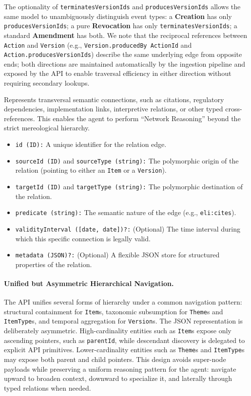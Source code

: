 \documentclass[11pt]{article}
\begin{document}
\begin{description}
    The optionality of \texttt{terminatesVersionIds} and \texttt{producesVersionIds} allows the same model to unambiguously distinguish event types: a \textbf{Creation} has only \texttt{producesVersionIds}; a pure \textbf{Revocation} has only \texttt{terminatesVersionIds}; a standard \textbf{Amendment} has both. We note that the reciprocal references between \texttt{Action} and \texttt{Version} (e.g., \texttt{Version.producedBy ActionId} and \texttt{Action.producesVersionIds}) describe the same underlying edge from opposite ends; both directions are maintained automatically by the ingestion pipeline and exposed by the API to enable traversal efficiency in either direction without requiring secondary lookups.

    \item[\texttt{Relation}:] Represents transversal semantic connections, such as citations, regulatory dependencies, implementation links, interpretive relations, or other typed cross-references. This enables the agent to perform ``Network Reasoning'' beyond the strict mereological hierarchy.
    \begin{itemize}
        \item \texttt{id (ID):} A unique identifier for the relation edge.
        \item \texttt{sourceId (ID)} and \texttt{sourceType (string):} The polymorphic origin of the relation (pointing to either an \texttt{Item} or a \texttt{Version}).
        \item \texttt{targetId (ID)} and \texttt{targetType (string):} The polymorphic destination of the relation.
        \item \texttt{predicate (string):} The semantic nature of the edge (e.g., \texttt{eli:cites}).
        \item \texttt{validityInterval ([date, date])?:} (Optional) The time interval during which this specific connection is legally valid.
        \item \texttt{metadata (JSON)?:} (Optional) A flexible JSON store for structured properties of the relation.
    \end{itemize}
\end{description}

\paragraph{Unified but Asymmetric Hierarchical Navigation.}
The API unifies several forms of hierarchy under a common navigation pattern: structural containment for \texttt{Item}s, taxonomic subsumption for \texttt{Theme}s and \texttt{ItemType}s, and temporal aggregation for \texttt{Version}s. The JSON representation is deliberately asymmetric. High-cardinality entities such as \texttt{Item}s expose only ascending pointers, such as \texttt{parentId}, while descendant discovery is delegated to explicit API primitives. Lower-cardinality entities such as \texttt{Theme}s and \texttt{ItemType}s may expose both parent and child pointers. This design avoids super-node payloads while preserving a uniform reasoning pattern for the agent: navigate upward to broaden context, downward to specialize it, and laterally through typed relations when needed.
\end{document}
